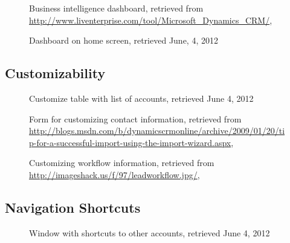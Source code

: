 \begin{figure}[htbp]
	\centering
	\caption[Microsoft Dynamics CRM: Business intelligence dashboard]{Business intelligence dashboard, retrieved from \url{http://www.liventerprise.com/tool/Microsoft_Dynamics_CRM/}, \downloadDate}
\end{figure}

\begin{figure}[htbp]
	\centering
	\caption[Microsoft Dynamics CRM: Dashboard on home screen]{Dashboard on home screen, retrieved June, 4, 2012}
\end{figure}

\FloatBarrier
\subsection{Customizability}

\begin{figure}[htbp]
	\centering
	\caption[Microsoft Dynamics CRM: Customize table with list of accounts]{Customize table with list of accounts, retrieved June 4, 2012}
\end{figure}

\begin{figure}[htbp]
	\centering
	\caption[Microsoft Dynamics CRM: Form for customizing contact information]{Form for customizing contact information, retrieved from \url{http://blogs.msdn.com/b/dynamicscrmonline/archive/2009/01/20/tip-for-a-successful-import-using-the-import-wizard.aspx}, \downloadDate}
\end{figure}

\begin{figure}[htbp]
	\centering
	\caption[Microsoft Dynamics CRM: Customizing workflow information]{Customizing workflow information, retrieved from \url{http://imageshack.us/f/97/leadworkflow.jpg/}, \downloadDate}
\end{figure}

\FloatBarrier
\subsection{Navigation Shortcuts}

\begin{figure}[htbp]
	\centering
	\caption[Microsoft Dynamics CRM: Window with shortcuts to other accounts]{Window with shortcuts to other accounts, retrieved June 4, 2012}
\end{figure}

